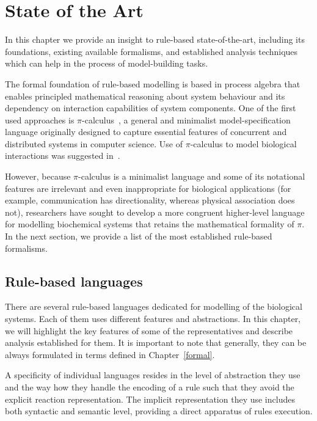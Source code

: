 \documentclass[11pt,a4paper]{report}
\begin{document}
\chapter{State of the Art} \label{chap:state}

In this chapter we provide an insight to rule-based state-of-the-art, including its foundations, existing available formalisms, and established analysis techniques which can help in the process of model-building tasks.

The formal foundation of rule-based modelling is based in process algebra that enables principled mathematical reasoning about system behaviour and its dependency on interaction capabilities of system components. One of the first used approaches is $\pi$-calculus~\cite{milner1999communicating}, a general and minimalist model-specification language originally designed to capture essential features of concurrent and distributed systems in computer science. Use of $\pi$-calculus to model biological interactions was suggested in~\cite{regev2000representation}.

However, because $\pi$-calculus is a minimalist language and some of its notational features are irrelevant and even inappropriate for biological applications (for example, communication has directionality, whereas physical association does not), researchers have sought to develop a more congruent higher-level language for
modelling biochemical systems that retains the mathematical formality of $\pi$. In the next section, we provide a list of the most established rule-based formalisms.

\section{Rule-based languages}
\label{rule_based_languages}

There are several rule-based languages dedicated for modelling of the biological systems. Each of them uses different features and abstractions. In this chapter, we will highlight the key features of some of the representatives and describe analysis established for them. It is important to note that generally, they can be always formulated in terms defined in Chapter~\ref{formal}.

A specificity of individual languages resides in the level of abstraction they use and the way how they handle the encoding of a rule such that they avoid the explicit reaction representation. The implicit representation they use includes both syntactic and semantic level, providing a direct apparatus of rules execution.
\end{document}
